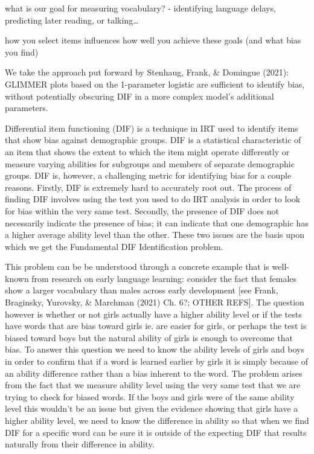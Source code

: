\documentclass[10pt, letterpaper]{article}
\begin{document}
what is our goal for measuring vocabulary? - identifying language
delays, predicting later reading, or talking\ldots{}

how you select items influences how well you achieve these goals (and
what bias you find)

We take the approach put forward by Stenhaug, Frank, \& Domingue (2021):
GLIMMER plots based on the 1-parameter logistic are sufficient to
identify bias, without potentially obscuring DIF in a more complex
model's additional parameters.

Differential item functioning (DIF) is a technique in IRT used to
identify items that show bias against demographic groups. DIF is a
statistical characteristic of an item that shows the extent to which the
item might operate differently or measure varying abilities for
subgroups and members of separate demographic groups. DIF is, however, a
challenging metric for identifying bias for a couple reasons. Firstly,
DIF is extremely hard to accurately root out. The process of finding DIF
involves using the test you used to do IRT analysis in order to look for
bias within the very same test. Secondly, the presence of DIF does not
necessarily indicate the presence of bias; it can indicate that one
demographic has a higher average ability level than the other. These two
issues are the basis upon which we get the Fundamental DIF
Identification problem.

This problem can be be understood through a concrete example that is
well-known from research on early language learning: consider the fact
that females show a larger vocabulary than males across early
development {[}see Frank, Braginsky, Yurovsky, \& Marchman (2021) Ch.
6?; OTHER REFS{]}. The question however is whether or not girls actually
have a higher ability level or if the tests have words that are bias
toward girls ie. are easier for girls, or perhaps the test is biased
toward boys but the natural ability of girls is enough to overcome that
bias. To answer this question we need to know the ability levels of
girls and boys in order to confirm that if a word is learned earlier by
girls it is simply because of an ability difference rather than a bias
inherent to the word. The problem arises from the fact that we measure
ability level using the very same test that we are trying to check for
biased words. If the boys and girls were of the same ability level this
wouldn't be an issue but given the evidence showing that girls have a
higher ability level, we need to know the difference in ability so that
when we find DIF for a specific word can be sure it is outside of the
expecting DIF that results naturally from their difference in ability.
\end{document}
